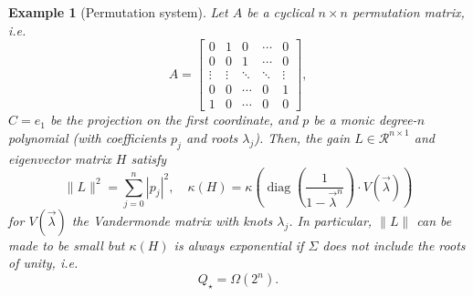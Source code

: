 \documentclass[11pt]{article}
\def\R{{\mathcal R}}
\def\R{\ensuremath{\mathcal R}}
\newtheorem{example}[theorem]{Example}
\numberwithin{equation}{section}
\begin{document}
\begin{example}[Permutation system]
\label{example:permutationqstar}
    Let $A$ be a cyclical $n \times n$ permutation matrix, i.e.
\[
A = \begin{bmatrix}
0 & 1 & 0 & \cdots & 0 \\
0 & 0 & 1 & \cdots & 0 \\
\vdots & \vdots & \ddots & \ddots & \vdots \\
0 & 0 & \cdots & 0 & 1 \\
1 & 0 & \cdots & 0 & 0
\end{bmatrix},
\]
$C = e_1$ be the projection on the first coordinate, and $p$ be a monic degree-$n$ polynomial (with coefficients $p_j$ and roots $\lambda_j$).
Then, the gain $L \in \R^{n \times 1}$ and eigenvector matrix $H$ 
satisfy $$\|L\|^2 = \sum_{j=0}^{n} |p_j|^2, \quad \kappa(H) = \kappa\left(\operatorname{diag}\left(\frac{1}{1 - \vec{\lambda}^n}\right) \cdot V(\vec{\lambda})\right)$$
for $V(\vec{\lambda})$ the Vandermonde matrix with knots $\lambda_j$. In particular, $\|L\|$ can be made to be small but $\kappa(H)$ is always exponential if $\Sigma$ does not include the roots of unity, i.e. $$Q_\star = \Omega(2^n).$$ 
\end{example}
\end{document}
